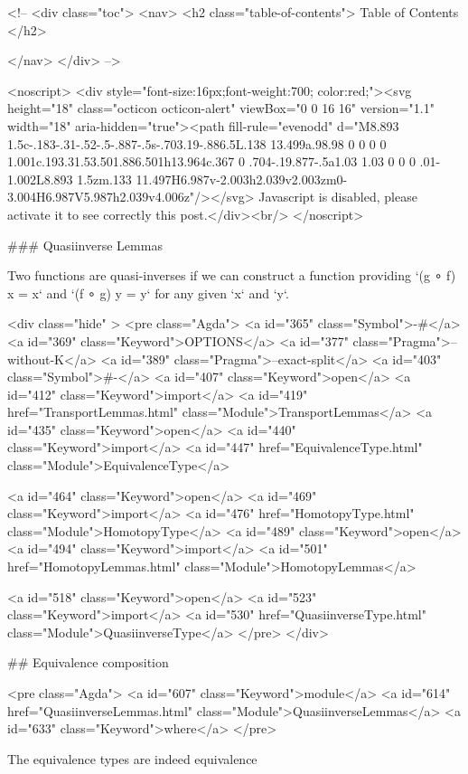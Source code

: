   <!-- 
  <div class="toc">
    <nav>
    <h2 class="table-of-contents"> Table of Contents </h2>
      

    </nav>
  </div>
   -->

  <noscript>
  <div style="font-size:16px;font-weight:700; color:red;"><svg height="18" class="octicon octicon-alert" viewBox="0 0 16 16" version="1.1" width="18" aria-hidden="true"><path fill-rule="evenodd" d="M8.893 1.5c-.183-.31-.52-.5-.887-.5s-.703.19-.886.5L.138 13.499a.98.98 0 0 0 0 1.001c.193.31.53.501.886.501h13.964c.367 0 .704-.19.877-.5a1.03 1.03 0 0 0 .01-1.002L8.893 1.5zm.133 11.497H6.987v-2.003h2.039v2.003zm0-3.004H6.987V5.987h2.039v4.006z"/></svg> Javascript is disabled, please activate it to see correctly this post.</div><br/>
  </noscript>

  ### Quasiinverse Lemmas

Two functions are quasi-inverses if we can construct a function providing
`(g ∘ f) x = x` and `(f ∘ g) y = y` for any given `x` and `y`.

<div class="hide" >
<pre class="Agda">
<a id="365" class="Symbol">{-#</a> <a id="369" class="Keyword">OPTIONS</a> <a id="377" class="Pragma">--without-K</a> <a id="389" class="Pragma">--exact-split</a> <a id="403" class="Symbol">#-}</a>
<a id="407" class="Keyword">open</a> <a id="412" class="Keyword">import</a> <a id="419" href="TransportLemmas.html" class="Module">TransportLemmas</a>
<a id="435" class="Keyword">open</a> <a id="440" class="Keyword">import</a> <a id="447" href="EquivalenceType.html" class="Module">EquivalenceType</a>

<a id="464" class="Keyword">open</a> <a id="469" class="Keyword">import</a> <a id="476" href="HomotopyType.html" class="Module">HomotopyType</a>
<a id="489" class="Keyword">open</a> <a id="494" class="Keyword">import</a> <a id="501" href="HomotopyLemmas.html" class="Module">HomotopyLemmas</a>


<a id="518" class="Keyword">open</a> <a id="523" class="Keyword">import</a> <a id="530" href="QuasiinverseType.html" class="Module">QuasiinverseType</a>
</pre>
</div>

## Equivalence composition

<pre class="Agda">
<a id="607" class="Keyword">module</a> <a id="614" href="QuasiinverseLemmas.html" class="Module">QuasiinverseLemmas</a> <a id="633" class="Keyword">where</a>
</pre>

The equivalence types are indeed equivalence

